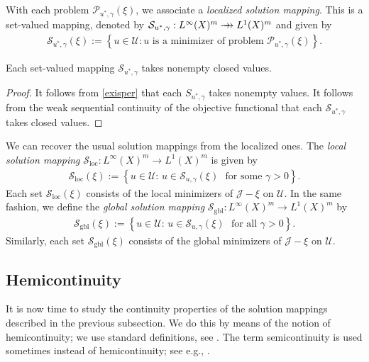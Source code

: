 \documentclass[hidelinks,onefignum,onetabnum]{siamart220329}
\newcommand{\rrightarrow}{\mathrel{\mathrlap{\rightarrow}\mkern1mu\rightarrow}}
\let\twoheadrightarrow\rrightarrow
\begin{document}
With each problem $\mathcal P_{u^*,\gamma}(\xi)$, we associate a \textit{localized solution mapping}. This is a  set-valued mapping, denoted by $\mathcal S_{u^*,\gamma}:{L^\infty(X)^m}\twoheadrightarrow L^1(X)^m$ and  given by
\begin{align*}
	\mathcal S_{u^*,\gamma}(\xi):=\left\lbrace u\in\mathcal U: \text{$u$ is a minimizer of problem $\mathcal P_{u^*,\gamma}(\xi)$} \right\rbrace.
\end{align*}

\begin{proposition}\label{nonemptysm}
	Each set-valued mapping $\mathcal S_{u^*,\gamma}$ takes nonempty closed values.
\end{proposition}
\begin{proof}
	It follows from \cref{exisper} that each $S_{u^*,\gamma}$ takes nonempty values. It follows from the weak sequential continuity of the objective functional that each $\mathcal S_{u^*,\gamma}$ takes closed values.
\end{proof}
We can recover the usual solution mappings from the localized ones.
The \textit{local solution mapping}  $\mathcal S_{\text{loc}}: {L^\infty(X)^m}\to {L^1(X)^m}$ is given by
\begin{align*}
	\mathcal S_{\text{loc}}(\xi):=\left\lbrace u\in\mathcal U:\, u\in \mathcal S_{u,\gamma}(\xi) \,\,\,\,\text{for some $\gamma>0$}\right\rbrace.
\end{align*}
Each set $\mathcal S_{\text{loc}}(\xi)$  consists of the local minimizers of $\mathcal J-\xi$ on $\mathcal U$.
In the same fashion, we define the \textit{global solution mapping}  $\mathcal S_{\text{gbl}}: {L^\infty(X)^m}\to {L^1(X)^m}$ by 
\begin{align*}
	\mathcal S_{\text{gbl}}(\xi):=\left\lbrace u\in\mathcal U:\, u \in \mathcal S_{u,\gamma}(\xi) \,\,\,\,\text{for all $\gamma>0$}\right\rbrace.
\end{align*}
Similarly, each set $\mathcal S_{\text{gbl}}(\xi)$  consists of the global minimizers of $\mathcal J-\xi$ on $\mathcal U$.


\subsection{Hemicontinuity}
It is now time to study the continuity properties of the solution mappings described in the previous subsection. We do this by means of the notion of hemicontinuity; we use standard definitions, see \cite[Definition 17.2]{Infdim}.  The term semicontinuity is used sometimes instead of hemicontinuity; see e.g., \cite[Section 1.4.1]{Frankowska}. 
\end{document}
